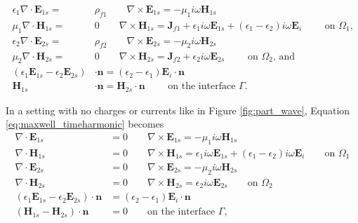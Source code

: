 \begin{align} \label{eq:maxwell_timeharmonic}
   \epsilon_1 \nabla \cdot \mathbf{E}_{1s} =& \rho_{f1} \qquad \nabla \times \mathbf{E}_{1s} = -\mu_1i\omega\mathbf{H}_{1s} \nonumber \\
   \mu_1\nabla \cdot \mathbf{H}_{1s} =& 0 \qquad \nabla \times \mathbf{H}_{1s} = \mathbf{J}_{f1} + \epsilon_1i\omega\mathbf{E}_{1s} + (\epsilon_1-\epsilon_2)i\omega\mathbf{E}_{i}\qquad \text{ on $\Omega_1$,} \nonumber \\
   \epsilon_2 \nabla \cdot \mathbf{E}_{2s} =& \rho_{f2} \qquad \nabla \times \mathbf{E}_{2s} = -\mu_2i\omega \mathbf{H}_{2s} \nonumber \\
   \mu_2\nabla \cdot \mathbf{H}_{2s} =& 0 \qquad \nabla \times \mathbf{H}_{2s} = \mathbf{J}_{f2} + \epsilon_2i\omega\mathbf{E}_{2s} \qquad \text{ on $\Omega_2$, and} \nonumber \\
   (\epsilon_1\mathbf{E}_{1s}-\epsilon_2\mathbf{E}_{2s})&\cdot\mathbf{n} = (\epsilon_2-\epsilon_1)\mathbf{E}_i\cdot\mathbf{n} \nonumber \\
   \mathbf{H}_{1s}&\cdot \mathbf{n} = \mathbf{H}_{2s}\cdot\mathbf{n} \qquad\text{ on the interface $\Gamma$}.
\end{align} 

In a setting with no charges or currents like in Figure \ref{fig:part_wave}, Equation \eqref{eq:maxwell_timeharmonic} becomes
 \begin{align} \label{eq:maxwell_nocharge}
 \nabla \cdot \mathbf{E}_{1s} &= 0 \qquad \nabla \times \mathbf{E}_{1s} = -\mu_1i\omega\mathbf{H}_{1s} \nonumber \\
 \nabla \cdot \mathbf{H}_{1s} &= 0 \qquad \nabla \times \mathbf{H}_{1s} = \epsilon_1i\omega\mathbf{E}_{1s} + (\epsilon_1-\epsilon_2)i\omega\mathbf{E}_{i} \qquad \text{on $\Omega_1$} \nonumber \\
 \nabla \cdot \mathbf{E}_{2s} &= 0 \qquad \nabla \times \mathbf{E}_{2s} = -\mu_2i\omega\mathbf{H}_{2s} \nonumber \\
 \nabla \cdot \mathbf{H}_{2s} &= 0 \qquad \nabla \times \mathbf{H}_{2s} = \epsilon_2i\omega\mathbf{E}_{2s} \qquad \text{on $\Omega_2$} \nonumber \\
 (\epsilon_1\mathbf{E}_{1s} - \epsilon_2\mathbf{E}_{2s})\cdot\mathbf{n} &= (\epsilon_2-\epsilon_1)\mathbf{E}_i\cdot \mathbf{n} \nonumber \\(\mathbf{H}_{1s} - \mathbf{H}_{2s})\cdot \mathbf{n}&=0 \qquad \text{on the interface $\Gamma$,}
 \end{align}
 
